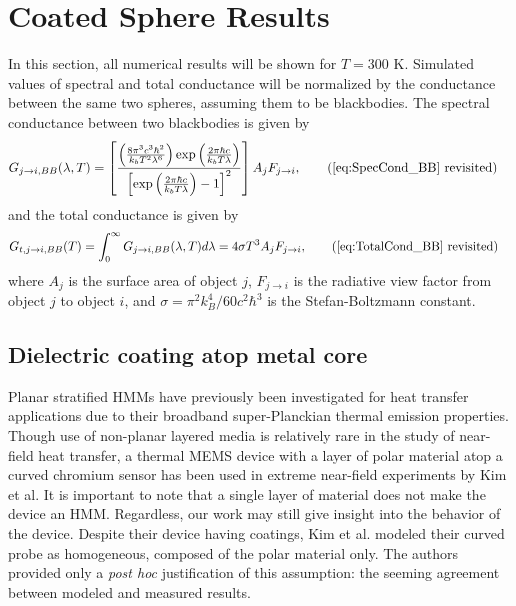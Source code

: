\section{Coated Sphere Results}
%
In this section, all numerical results will be shown for $T=300$ K. Simulated values of spectral and total conductance will be normalized by the conductance between the same two spheres, assuming them to be blackbodies. The spectral conductance between two blackbodies is given by
%
\begin{align}
G_{j \rightarrow i,BB}(\lambda, T) &= \left[ \frac{ \left( \frac{8 \pi^{3} c^{3} \hbar^{2}}{k_{b} T^{2} \lambda^{6}} \right) \exp{\left( \frac{2 \pi \hbar c}{k_{b} T \lambda} \right)} }{ \left[ \exp{\left( \frac{2 \pi \hbar c}{k_{b} T \lambda} \right)} - 1 \right]^{2} } \right] A_{j} F_{j \rightarrow i},
\tag{\ref{eq:SpecCond_BB} revisited}
\end{align}
%
and the total conductance is given by
%
\begin{align}
G_{t,j \rightarrow i,BB}(T) &= \int_{0}^{\infty} G_{j \rightarrow i,BB}(\lambda, T) d\lambda = 4 \sigma T^{3} A_{j} F_{j \rightarrow i},
\tag{\ref{eq:TotalCond_BB} revisited}
\end{align}
%
where $A_{j}$ is the surface area of object $j$, $F_{j \rightarrow i}$ is the radiative view factor from object $j$ to object $i$, and $\sigma=\pi^{2} k_{B}^{4}/60c^{2}\hbar^{3}$ is the Stefan-Boltzmann constant.

\subsection{Dielectric coating atop metal core}

Planar stratified HMMs have previously been investigated for heat transfer applications due to their broadband super-Planckian thermal emission properties.\cite{Guo2012, Guo2013} Though use of non-planar layered media is relatively rare in the study of near-field heat transfer, a thermal MEMS device with a layer of polar material atop a curved chromium sensor has been used in extreme near-field experiments by Kim et al.\cite{Kim2015} It is important to note that a single layer of material does not make the device an HMM. Regardless, our work may still give insight into the behavior of the device. Despite their device having coatings, Kim et al. modeled their curved probe as homogeneous, composed of the polar material only. The authors provided only a \textit{post hoc} justification of this assumption: the seeming agreement between modeled and measured results.

